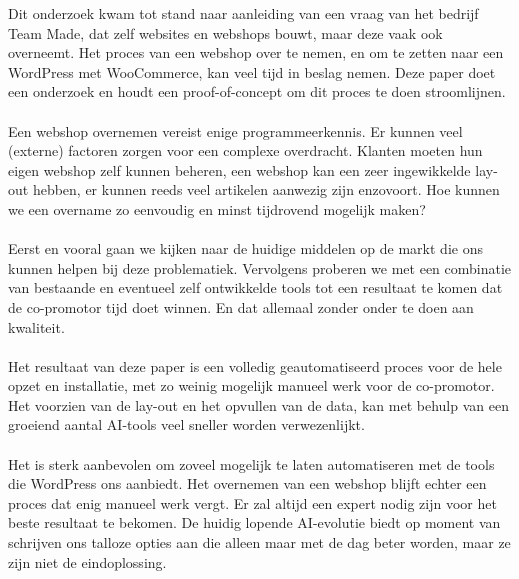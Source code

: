 Dit onderzoek kwam tot stand naar aanleiding van een vraag van het bedrijf Team Made, dat zelf websites en webshops bouwt, maar deze vaak ook overneemt. Het proces van een webshop over te nemen, en om te zetten naar een WordPress met WooCommerce, kan veel tijd in beslag nemen. Deze paper doet een onderzoek en houdt een proof-of-concept om dit proces te doen stroomlijnen.
\\\\
Een webshop overnemen vereist enige programmeerkennis. Er kunnen veel (externe) factoren zorgen voor een complexe overdracht. Klanten moeten hun eigen webshop zelf kunnen beheren, een webshop kan een zeer ingewikkelde lay-out hebben, er kunnen reeds veel artikelen aanwezig zijn enzovoort. Hoe kunnen we een overname zo eenvoudig en minst tijdrovend mogelijk maken?
\\\\
Eerst en vooral gaan we kijken naar de huidige middelen op de markt die ons kunnen helpen bij deze problematiek. Vervolgens proberen we met een combinatie van bestaande en eventueel zelf ontwikkelde tools tot een resultaat te komen dat de co-promotor tijd doet winnen. En dat allemaal zonder onder te doen aan kwaliteit. 
\\\\
Het resultaat van deze paper is een volledig geautomatiseerd proces voor de hele opzet en installatie, met zo weinig mogelijk manueel werk voor de co-promotor. Het voorzien van de lay-out en het opvullen van de data, kan met behulp van een groeiend aantal AI-tools veel sneller worden verwezenlijkt.
\\\\
Het is sterk aanbevolen om zoveel mogelijk te laten automatiseren met de tools die WordPress ons aanbiedt. Het overnemen van een webshop blijft echter een proces dat enig manueel werk vergt. Er zal altijd een expert nodig zijn voor het beste resultaat te bekomen. De huidig lopende AI-evolutie biedt op moment van schrijven ons talloze opties aan die alleen maar met de dag beter worden, maar ze zijn niet de eindoplossing.



